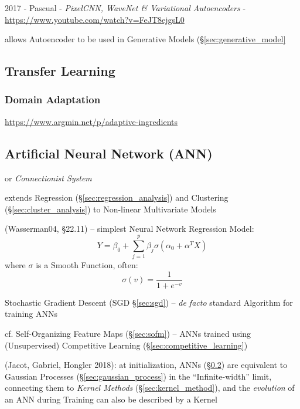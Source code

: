 2017 - Pascual - \emph{PixelCNN, WaveNet \& Variational Autoencoders} -
\url{https://www.youtube.com/watch?v=FeJT8ejgsL0}

allows Autoencoder to be used in Generative Models (\S\ref{sec:generative_model}



\subsection{Transfer Learning}\label{sec:transfer_learning}

\subsubsection{Domain Adaptation}\label{sec:domain_adaptation}

\url{https://www.argmin.net/p/adaptive-ingredients}



\subsection{Artificial Neural Network (ANN)}\label{sec:ann}


or \emph{Connectionist System}

extends Regression (\S\ref{sec:regression_analysis}) and Clustering
(\S\ref{sec:cluster_analysis}) to Non-linear Multivariate Models

(Wasserman04, \S22.11) --
simplest Neural Network Regression Model:
\[
  Y = \beta_0 + \sum_{j=1}^p \beta_j \sigma (\alpha_0 + \alpha^T X)
\]
where $\sigma$ is a Smooth Function, often:
\[
  \sigma(v) = \frac{1}{1 + e^{-v}}
\]

Stochastic Gradient Descent (SGD \S\ref{sec:sgd}) -- \emph{de facto} standard
Algorithm for training ANNs

\fist cf. Self-Organizing Feature Maps (\S\ref{sec:sofm}) -- ANNs trained using
(Unsupervised) Competitive Learning (\S\ref{sec:competitive_learning})

(Jacot, Gabriel, Hongler 2018): at initialization, ANNs (\S\ref{sec:ann}) are
equivalent to Gaussian Processes (\S\ref{sec:gaussian_process}) in the
``Infinite-width'' limit, connecting them to \emph{Kernel Methods}
(\S\ref{sec:kernel_method}), and the \emph{evolution} of an ANN during Training
can also be described by a Kernel


